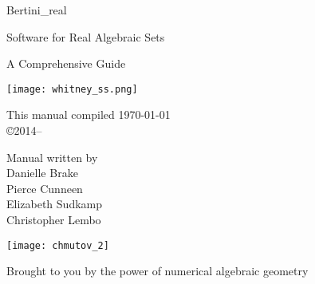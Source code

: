 \documentclass[10pt, twoside]{article}
\begin{document}
\pagestyle{front} 
	


\begin{titlepage}

	\begin{center}
	\vspace{2cm}
	{\Large Bertini\_real}

\vspace{\baselineskip}
	{\large Software for Real Algebraic Sets}



	{\large A Comprehensive Guide}	

	\vspace{3cm}
	\texttt{[image: whitney\_ss.png]}
	\end{center}

	\vfill

	\begin{minipage}{\linewidth}

	\begin{minipage}{0.4\linewidth}
	\centering
	This manual compiled \today \\
	\copyright 2014--\the\year
	\end{minipage}
	\hfill
	\begin{minipage}{0.4\linewidth}
	\centering Manual written by \vspace{\baselineskip}
	\\  Danielle Brake \\ Pierce Cunneen \\ Elizabeth Sudkamp \\ Christopher Lembo
	\end{minipage}

	\end{minipage}

	

\end{titlepage}



\clearpage

\thispagestyle{empty}

\quad 
\vspace{2in}

\begin{center}
\texttt{[image: chmutov\_2]}

Brought to you by the power of numerical algebraic geometry
\end{center}


\vfill
\end{document}
